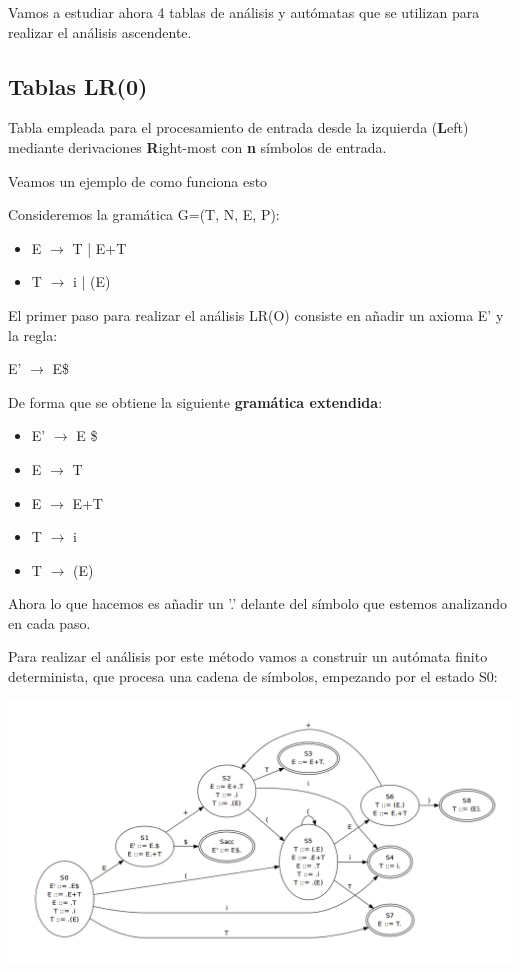\documentclass{apuntes}
\begin{document}
Vamos a estudiar ahora 4 tablas de análisis y autómatas que se utilizan para realizar el análisis ascendente.

\subsection{Tablas LR(0)}

\begin{defn}[Tabla LR(n)]
Tabla empleada para el procesamiento de entrada desde la izquierda (\textbf{L}eft) mediante derivaciones \textbf{R}ight-most con \textbf{n} símbolos de entrada.

\end{defn}

Veamos un ejemplo de como funciona esto
\begin{example}
Consideremos la gramática G=(T, N, E, P):
\begin{itemize}
\item E $\rightarrow$ T | E+T
\item T $\rightarrow$ i | (E)
\end{itemize}

El primer paso para realizar el análisis LR(O) consiste en añadir un axioma E' y la regla:
\begin{center}
E' $\rightarrow$ E\$
\end{center}

De forma que se obtiene la siguiente \textbf{gramática extendida}:
\begin{itemize}
\item E' $\rightarrow$ E \$
\item E $\rightarrow$ T
\item E $\rightarrow$ E+T
\item T $\rightarrow$ i
\item T $\rightarrow$ (E)
\end{itemize}

Ahora lo que hacemos es añadir un '.' delante del símbolo que estemos analizando en cada paso.

Para realizar el análisis por este método vamos a construir un autómata finito determinista, que procesa una cadena de símbolos, empezando por el estado S0:

\begin{center}
\includegraphics[scale=0.45]{img/automatalr0.jpg}
\end{center}


\end{example}
\end{document}
